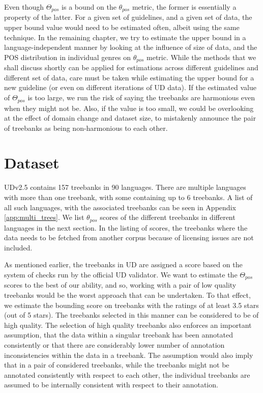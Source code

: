 Even though $\Theta_{pos}$ is a bound on the $\theta_{pos}$ metric, the former is essentially a property of the latter. For a given set of guidelines, and a given set of data, the upper bound value would need to be estimated often, albeit using the same technique. In the remaining chapter, we try to estimate the upper bound in a language-independent manner by looking at the influence of size of data, and the POS distribution in individual genres on $\theta_{pos}$ metric. While the methods that we shall discuss shortly can be applied for estimations across different guidelines and different set of data, care must be taken while estimating the upper bound for a new guideline (or even on different iterations of UD data). If the estimated value of $\Theta_{pos}$ is too large, we run the risk of saying the treebanks are harmonious even when they might not be. Also, if the value is too small, we could be overlooking at the effect of domain change and dataset size, to mistakenly announce the pair of treebanks as being non-harmonious to each other.

\section{Dataset}
\label{sec:pos-harmony-dataset}

UDv2.5 \citep{UDv2.5} contains 157 treebanks in 90 languages. There are multiple languages with more than one treebank, with some containing up to 6 treebanks. A list of all such languages, with the associated treebanks can be seen in Appendix \ref{app:multi_trees}. We list $\theta_{pos}$ scores of the different treebanks in different languages in the next section. In the listing of scores, the treebanks where the data needs to be fetched from another corpus because of licensing issues are not included.

As mentioned earlier, the treebanks in UD are assigned a score based on the system of checks run by the official UD validator. We want to estimate the $\Theta_{pos}$ scores to the best of our ability, and so, working with a pair of low quality treebanks would be the worst approach that can be undertaken. To that effect, we estimate the bounding score on treebanks with the ratings of at least 3.5 stars (out of 5 stars). The treebanks selected in this manner can be considered to be of high quality. The selection of high quality treebanks also enforces an important assumption, that the data within a singular treebank has been annotated consistently or that there are considerably lower number of annotation inconsistencies within the data in a treebank. The assumption would also imply that in a pair of considered treebanks, while the treebanks might not be annotated consistently with respect to each other, the individual treebanks are assumed to be internally consistent with respect to their annotation.

